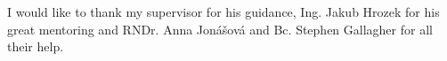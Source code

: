 \setcounter{page}{1}

\begin{ThesisDeclaration}
  \DeclarationText
  \AdvisorName
\end{ThesisDeclaration}

\begin{ThesisThanks}
I would like to thank my supervisor for his guidance, Ing. Jakub Hrozek for
his great mentoring and RNDr. Anna Jonášová and Bc. Stephen Gallagher
for all their help.
\end{ThesisThanks}

\begin{ThesisAbstract}

\end{ThesisAbstract}

\begin{ThesisKeyWords}
  
\end{ThesisKeyWords}
